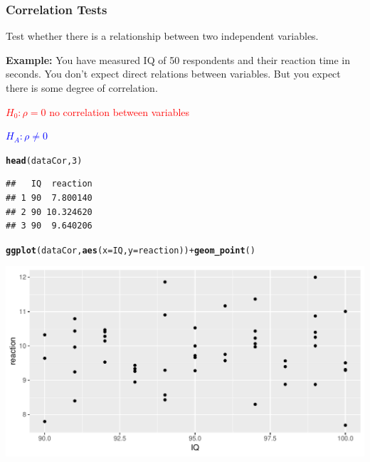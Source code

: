\documentclass[12pt]{beamer}\usepackage[]{graphicx}\usepackage[]{color}
\makeatletter
\newcommand{\hlnum}[1]{\textcolor[rgb]{0.686,0.059,0.569}{#1}}%
\newcommand{\hlopt}[1]{\textcolor[rgb]{0,0,0}{#1}}%
\newcommand{\hlstd}[1]{\textcolor[rgb]{0.345,0.345,0.345}{#1}}%
\newcommand{\hlkwc}[1]{\textcolor[rgb]{0.333,0.667,0.333}{#1}}%
\newcommand{\hlkwd}[1]{\textcolor[rgb]{0.737,0.353,0.396}{\textbf{#1}}}%
\newenvironment{kframe}{%
 \def\at@end@of@kframe{}%
 \ifinner\ifhmode%
  \def\at@end@of@kframe{\end{minipage}}%
  \begin{minipage}{\columnwidth}%
 \fi\fi%
 \def\FrameCommand##1{\hskip\@totalleftmargin \hskip-\fboxsep
 \colorbox{shadecolor}{##1}\hskip-\fboxsep
     \hskip-\linewidth \hskip-\@totalleftmargin \hskip\columnwidth}%
 \MakeFramed {\advance\hsize-\width
   \@totalleftmargin\z@ \linewidth\hsize
   \@setminipage}}%
 {\par\unskip\endMakeFramed%
 \at@end@of@kframe}
\newenvironment{knitrout}{}{} %
\makeatother
\begin{document}

\begin{frame}\large
\frametitle{Correlation Tests}

Test whether there is a relationship between two independent variables.\bigskip

\textbf{Example:} You have measured IQ of 50 respondents and their reaction time in seconds. You don't expect direct relations between variables. But you expect there is some degree of correlation. \smallskip{}

\textcolor{red}{$H_0: \rho=0$ no correlation between variables} \smallskip

\textcolor{blue}{$H_A: \rho\neq 0$} 

\end{frame}


\begin{frame}[fragile]



\begin{knitrout}\footnotesize
{}\color{fgcolor}\begin{kframe}
\begin{alltt}
\hlkwd{head}\hlstd{(dataCor,} \hlnum{3}\hlstd{)}
\end{alltt}
\begin{verbatim}
##   IQ  reaction
## 1 90  7.800140
## 2 90 10.324620
## 3 90  9.640206
\end{verbatim}
\begin{alltt}
\hlkwd{ggplot}\hlstd{(dataCor,} \hlkwd{aes}\hlstd{(}\hlkwc{x}\hlstd{=IQ,} \hlkwc{y}\hlstd{=reaction))} \hlopt{+} \hlkwd{geom_point}\hlstd{()}
\end{alltt}
\end{kframe}

{\centering \includegraphics[width=1\textwidth]{figure/unnamed-chunk-16-1} 

}



\end{knitrout}

\end{frame}
\end{document}
